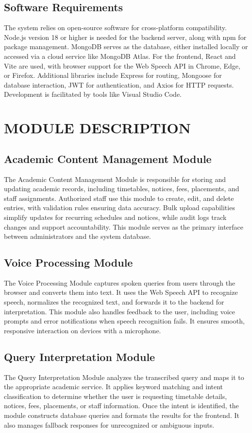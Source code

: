 \documentclass{article}
\begin{document}
\subsection{Software Requirements}
The system relies on open-source software for cross-platform compatibility. Node.js version 18 or higher is needed for the backend server, along with npm for package management. MongoDB serves as the database, either installed locally or accessed via a cloud service like MongoDB Atlas. For the frontend, React and Vite are used, with browser support for the Web Speech API in Chrome, Edge, or Firefox. Additional libraries include Express for routing, Mongoose for database interaction, JWT for authentication, and Axios for HTTP requests. Development is facilitated by tools like Visual Studio Code.

\section{MODULE DESCRIPTION}

\subsection{Academic Content Management Module}
The Academic Content Management Module is responsible for storing and updating academic records, including timetables, notices, fees, placements, and staff assignments. Authorized staff use this module to create, edit, and delete entries, with validation rules ensuring data accuracy. Bulk upload capabilities simplify updates for recurring schedules and notices, while audit logs track changes and support accountability. This module serves as the primary interface between administrators and the system database.

\subsection{Voice Processing Module}
The Voice Processing Module captures spoken queries from users through the browser and converts them into text. It uses the Web Speech API to recognize speech, normalizes the recognized text, and forwards it to the backend for interpretation. This module also handles feedback to the user, including voice prompts and error notifications when speech recognition fails. It ensures smooth, responsive interaction on devices with a microphone.

\subsection{Query Interpretation Module}
The Query Interpretation Module analyzes the transcribed query and maps it to the appropriate academic service. It applies keyword matching and intent classification to determine whether the user is requesting timetable details, notices, fees, placements, or staff information. Once the intent is identified, the module constructs database queries and formats the results for the frontend. It also manages fallback responses for unrecognized or ambiguous inputs.
\end{document}
